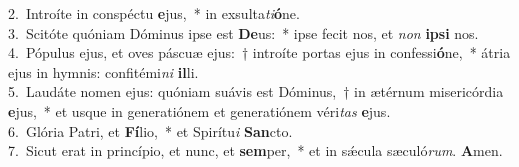 {2.~}Introíte in conspéctu \textbf{e}jus,~* in exsulta\textit{ti}\textbf{ó}ne.\\
{3.~}Scitóte quóniam Dóminus ipse est \textbf{De}us:~* ipse fecit nos, et \textit{non} \textbf{i}\textbf{psi} nos.\\
{4.~}Pópulus ejus, et oves páscuæ ejus:~† introíte portas ejus in confessi\textbf{ó}ne,~* átria ejus in hymnis: confitémi\textit{ni} \textbf{il}li.\\
{5.~}Laudáte nomen ejus: quóniam suávis est Dóminus,~† in ætérnum misericórdia \textbf{e}jus,~* et usque in generatiónem et generatiónem véri\textit{tas} \textbf{e}jus.\\
{6.~}Glória Patri, et \textbf{Fí}lio,~* et Spirítu\textit{i} \textbf{San}cto.\\
{7.~}Sicut erat in princípio, et nunc, et \textbf{sem}per,~* et in sǽcula sæculó\textit{rum}. \textbf{A}men.\\
